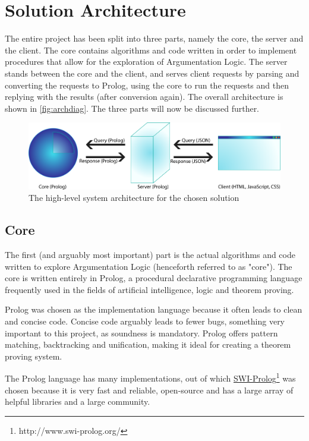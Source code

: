 \documentclass[11pt,twoside,a4paper]{report}
\begin{document}
\section{Solution Architecture}
\label{sec:solarch}
The entire project has been split into three parts, namely the core, the server and the client. The core contains algorithms and code written in order to implement procedures that allow for the exploration of Argumentation Logic. The server stands between the core and the client, and serves client requests by parsing and converting the requests to Prolog, using the core to run the requests and then replying with the results (after conversion again). The overall architecture is shown in \autoref{fig:archdiag}. The three parts will now be discussed further.

\begin{figure}[h]
\centerline{\includegraphics[scale=0.5]{img/system-diagram.png}}
\caption{The high-level system architecture for the chosen solution\label{fig:archdiag}}
\end{figure}

\subsection{Core}
The first (and arguably most important) part is the actual algorithms and code written to explore Argumentation Logic (henceforth referred to as "core"). The core is written entirely in Prolog, a procedural declarative programming language frequently used in the fields of artificial intelligence, logic and theorem proving. 

Prolog was chosen as the implementation language because it often leads to clean and concise code. Concise code arguably leads to fewer bugs, something very important to this project, as soundness is mandatory. Prolog offers pattern matching, backtracking and unification, making it ideal for creating a theorem proving system.

The Prolog language has many implementations, out of which \href{http://www.swi-prolog.org/}{SWI-Prolog}\footnote{http://www.swi-prolog.org/} was chosen because it is very fast and reliable, open-source and has a large array of helpful libraries and a large community.
\end{document}
